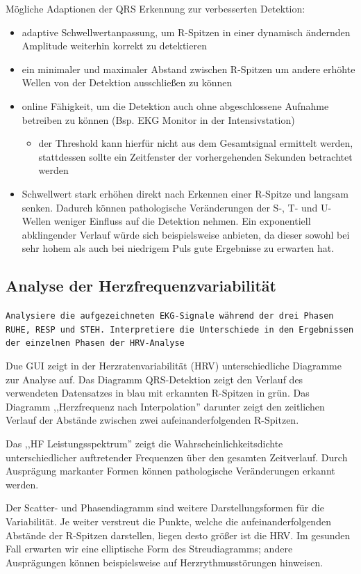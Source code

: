 \documentclass[a4paper,12pt,titlepage]{scrartcl}
\begin{document}
Mögliche Adaptionen der QRS Erkennung zur verbesserten Detektion:
\begin{itemize}
    \item adaptive Schwellwertanpassung, um R-Spitzen in einer dynamisch ändernden Amplitude weiterhin korrekt zu detektieren
    \item ein minimaler und maximaler Abstand zwischen R-Spitzen um andere erhöhte Wellen von der Detektion ausschließen zu können
    \item online Fähigkeit, um die Detektion auch ohne abgeschlossene Aufnahme betreiben zu können (Bsp. EKG Monitor in der Intensivstation)
          \begin{itemize}
              \item der Threshold kann hierfür nicht aus dem Gesamtsignal ermittelt werden, stattdessen sollte ein Zeitfenster der vorhergehenden Sekunden betrachtet werden
          \end{itemize}
    \item Schwellwert stark erhöhen direkt nach Erkennen einer R-Spitze und langsam senken. Dadurch können pathologische Veränderungen der S-, T- und U-Wellen weniger Einfluss auf die Detektion nehmen. Ein exponentiell abklingender Verlauf würde sich beispielsweise anbieten, da dieser sowohl bei sehr hohem als auch bei niedrigem Puls gute Ergebnisse zu erwarten hat.
\end{itemize}

\subsection{Analyse der Herzfrequenzvariabilität}
\texttt{Analysiere die aufgezeichneten EKG-Signale während der drei Phasen RUHE, RESP und STEH. Interpretiere die Unterschiede in den Ergebnissen der einzelnen Phasen der HRV-Analyse}

Due GUI zeigt in der Herzratenvariabilität (HRV) unterschiedliche Diagramme zur Analyse auf. Das Diagramm QRS-Detektion zeigt den Verlauf des verwendeten Datensatzes in blau mit erkannten R-Spitzen in grün.
Das Diagramm ,,Herzfrequenz nach Interpolation'' darunter zeigt den zeitlichen Verlauf der Abstände zwischen zwei aufeinanderfolgenden R-Spitzen.

Das ,,HF Leistungsspektrum'' zeigt die Wahrscheinlichkeitsdichte unterschiedlicher auftretender Frequenzen über den gesamten Zeitverlauf. Durch Ausprägung markanter Formen können pathologische Veränderungen erkannt werden.

Der Scatter- und Phasendiagramm sind weitere Darstellungsformen für die Variabilität. Je weiter verstreut die Punkte, welche die aufeinanderfolgenden Abstände der R-Spitzen darstellen, liegen desto größer ist die HRV. Im gesunden Fall erwarten wir eine elliptische Form des Streudiagramms; andere Ausprägungen können beispielsweise auf Herzrythmusstörungen hinweisen.
\end{document}
